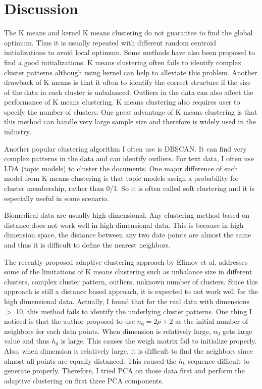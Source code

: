 \documentclass[aoas,preprint]{imsart}
\numberwithin{equation}{section}
\theoremstyle{plain}
\begin{document}
\section{Discussion}
The K means and kernel K means clustering do not guarantee to find the global optimum. Thus it is usually repeated with different random centroid initializations to avoid local optimum. Some methods have also been proposed to find a good initializations. K means clustering often fails to identify complex cluster patterns although using kernel can help to alleviate this problem. Another drawback of K means is that it often to identify the correct structure if the size of the data in each cluster is unbalanced. Outliers in the data can also affect the performance of K means clustering. K means clustering also requires user to specify the number of clusters. One great advantage of K means clustering is that this method can handle very large sample size and therefore is widely used in the industry. 

Another popular clustering algorithm I often use is DBSCAN. It can find very complex patterns in the data and can identify outliers. For text data, I often use LDA (topic models) to cluster the documents. One major difference of such model from K means clustering is that topic models assign a probability for cluster membership, rather than 0/1. So it is often called soft clustering and it is especially useful in some scenario.  

Biomedical data are usually high dimensional. Any clustering method based on distance does not work well in high dimensional data. This is because in high dimension space, the distance between any two date points are almost the same and thus it is difficult to define  the nearest neighbors.

The recently proposed adaptive clustering approach by  Efimov et al. addresses some of the limitations of K means clustering such as unbalance size in different clusters, complex cluster pattern, outliers, unknown number of clusters. Since this approach is still a distance based approach, it is expected to not work well for the high dimensional data. Actually, I found that for the real data with dimensions $>$ 10, this method fails to identify the underlying cluster patterns. One thing I noticed is that the author proposed to use $n_0=2p+2$ as the initial number of neighbors for each data points. When dimension is relatively large, $n_0$ gets large value and thus $h_0$ is large. This causes the weigh matrix fail to initialize properly. Also, when dimension is relatively large, it is difficult to find the neighbors since almost all points are equally distanced. This caused the $h_k$ sequence difficult to generate properly. Therefore, I tried PCA on those data first and perform the adaptive clustering on first three PCA components.


\end{document}
